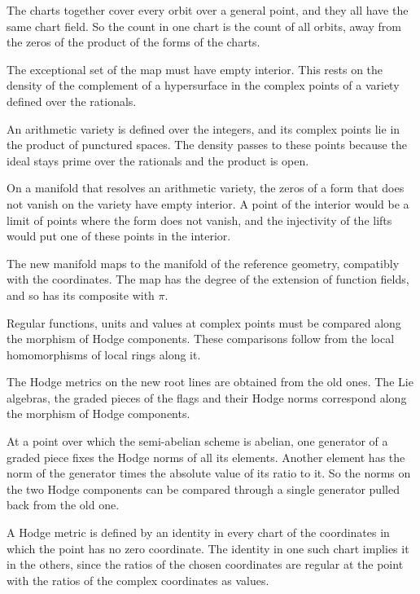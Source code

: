 The charts together cover every orbit over a general point, and they all have the same chart field. So the count in
one chart is the count of all orbits, away from the zeros of the product of the forms of the charts.

The exceptional set of the map must have empty interior. This rests on the density of the complement of a hypersurface
in the complex points of a variety defined over the rationals.

An arithmetic variety is defined over the integers, and its complex points lie in the product of punctured spaces.
The density passes to these points because the ideal stays prime over the rationals and the product is open.

On a manifold that resolves an arithmetic variety, the zeros of a form that does not vanish on the variety have empty
interior. A point of the interior would be a limit of points where the form does not vanish, and the
injectivity of the lifts would put one of these points in the interior.

The new manifold maps to the manifold of the reference geometry, compatibly with the coordinates. The map has the
degree of the extension of function fields, and so has its composite with $\pi$.

Regular functions, units and values at complex points must be compared along the morphism of Hodge components.
These comparisons follow from the local homomorphisms of local rings along it.

The Hodge metrics on the new root lines are obtained from the old ones. The Lie algebras, the graded pieces of
the flags and their Hodge norms correspond along the morphism of Hodge components.

At a point over which the semi-abelian scheme is abelian, one generator of a graded piece fixes the Hodge norms of
all its elements. Another element has the norm of the generator times the absolute value of its ratio to it. So
the norms on the two Hodge components can be compared through a single generator pulled back from the old one.

A Hodge metric is defined by an identity in every chart of the coordinates in which the point has no zero
coordinate. The identity in one such chart implies it in the others, since the ratios of the chosen coordinates are
regular at the point with the ratios of the complex coordinates as values.

